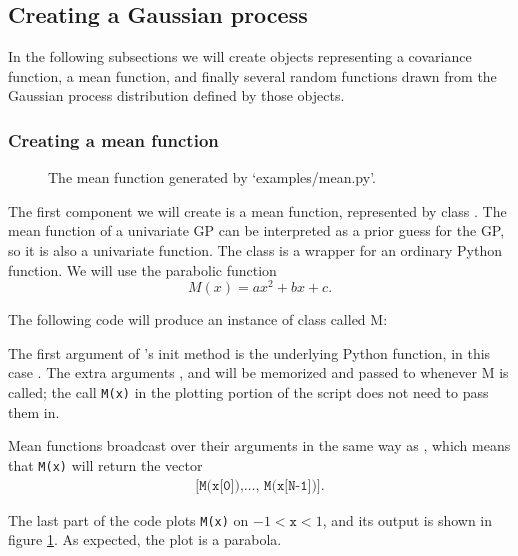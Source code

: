 \subsection{Creating a Gaussian process}\label{sub:inst}

In the following subsections we will create objects representing a covariance function, a mean function, and finally several random functions drawn from the Gaussian process distribution defined by those objects.

\subsubsection{Creating a mean function}\label{subsub:mean}

\begin{figure}
    \centering
    \caption{The mean function generated by {\sffamily `examples/mean.py'}.}
    \label{fig:mean}
\end{figure}

The first component we will create is a mean function, represented by class . The mean function of a univariate GP can be interpreted as a prior guess for the GP, so it is also a univariate function. The  class is a wrapper for an ordinary Python function. We will use the parabolic function
\begin{equation}
    M(x) = ax^2 + bx + c.
\end{equation}

The following code will produce an instance of class  called M:


The first argument of 's init method is the underlying Python function, in this case . The extra arguments ,   and  will be memorized and passed to  whenever M is called; the call \texttt{M(x)} in the plotting portion of the script does not need to pass them in.

Mean functions broadcast over their arguments in the same way as  \cite{numpybook}, which means that \texttt{M(x)} will return the vector
\begin{eqnarray*}
    \texttt{[M(x[0]),\ldots, M(x[N-1])]}.
\end{eqnarray*}

The last part of the code plots \texttt{M(x)} on $-1<\texttt{x}<1$, and its output is shown in figure \ref{fig:mean}. As expected, the plot is a parabola.

